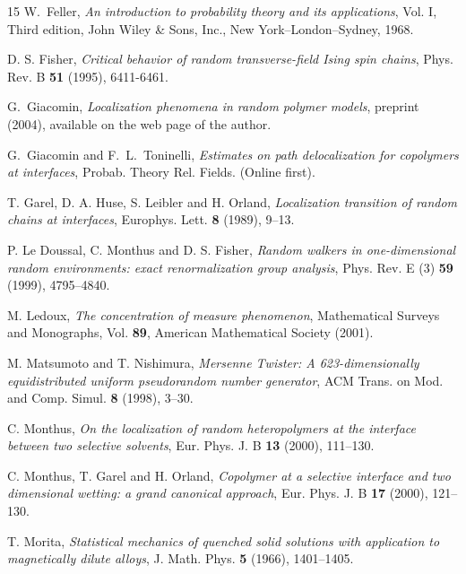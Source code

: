 \documentclass[reqno,11pt]{amsart}
\numberwithin{equation}{section}
\begin{document}
\begin{thebibliography}{15}
W.~Feller, \textit{An introduction to probability theory and its applications}, Vol. I,
 Third edition, John Wiley \& Sons, Inc.,
New York--London--Sydney, 1968.



D. S. Fisher, \textit{Critical behavior of random transverse-field
Ising spin chains}, Phys. Rev. B {\bf 51}  (1995), 6411-6461.


G.~Giacomin, \textit{Localization phenomena in random polymer models}, preprint (2004), available
on the web page of the author.

G.~Giacomin and F.~L.~Toninelli,
\textit{Estimates on path delocalization for copolymers at interfaces},
Probab. Theory Rel. Fields. (Online first).



T. Garel, D. A. Huse, S. Leibler and H. Orland,
\textit{Localization transition of random chains at interfaces},
Europhys. Lett. {\bf 8} (1989), 9--13.

P. Le Doussal, C.  Monthus and  D. S.  Fisher, \textit{Random
walkers in one-dimensional random environments: exact renormalization group analysis},
  Phys. Rev. E (3)  {\bf 59}  (1999),  4795--4840.

M. Ledoux, \textit{The concentration of measure phenomenon}, Mathematical Surveys and Monographs, Vol. {\bf 89}, American Mathematical Society (2001).



 M. Matsumoto and T. Nishimura, \textit{Mersenne Twister: A 623-dimensionally equidistributed uniform pseudorandom number generator}, ACM Trans. on Mod. and Comp. Simul. {\bf 8} (1998), 3--30.

 C. Monthus, \textit{On the localization of
random heteropolymers at the interface between two selective solvents},
Eur. Phys. J. B {\bf 13} (2000), 111--130.

 C. Monthus, T. Garel and H. Orland,
\textit{Copolymer at a selective interface and two dimensional wetting: a grand canonical approach},
Eur. Phys. J. B {\bf 17} (2000), 121--130.


 T. Morita, \textit{Statistical mechanics of quenched solid solutions with application to magnetically dilute alloys},
J. Math. Phys. {\bf 5} (1966), 1401--1405.


\end{thebibliography}
\end{document}

